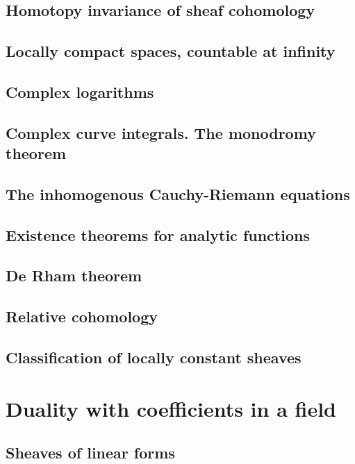 \documentclass[5pt]{article}
\theoremstyle{definition}
\theoremstyle{remark}
\begin{document}
	\subsection{Homotopy invariance of sheaf cohomology}
	
	\subsection{Locally compact spaces, countable at infinity}
	
	\subsection{Complex logarithms}
	
	\subsection{Complex curve integrals. The monodromy theorem}
	
	\subsection{The inhomogenous Cauchy-Riemann equations}
	
	\subsection{Existence theorems for analytic functions}
	
	\subsection{De Rham theorem}
	
	\subsection{Relative cohomology}
	
	\subsection{Classification of locally constant sheaves}
	
	\newpage
	
	\section{Duality with coefficients in a field}
	
	\subsection{Sheaves of linear forms}
	
\end{document}
